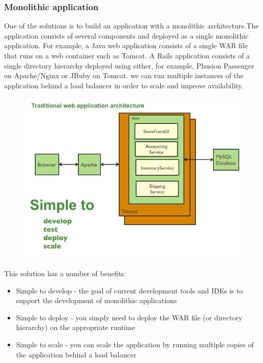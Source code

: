 \subsubsection{Monolithic application}
\label{subsec:subsec01}
One of the solutions is to build an application with a monolithic architecture.The application consists of several components and deployed as a single 
monolithic application. For example, a Java web application consists of a single WAR file that runs on a web container such as Tomcat.
  A Rails application consists of a single directory hierarchy deployed using either, for example, Phusion Passenger on Apache/Nginx or JRuby on Tomcat.
   we can run multiple instances of the application behind a load balancer in order to scale and improve availability.
\begin{figure}[h!]
	\centering
	\includegraphics[height=0.5\textheight]{fig01/monolithic}
	\label{fig:FilialesEtClients}
\end{figure}


This solution has a number of benefits:
\begin{itemize}
  \item Simple to develop - the goal of current development tools and IDEs is to support the development of monolithic applications
  \item Simple to deploy - you simply need to deploy the WAR file (or directory hierarchy) on the appropriate runtime
  \item Simple to scale - you can scale the application by running multiple copies of the application behind a load balancer
\end{itemize}

